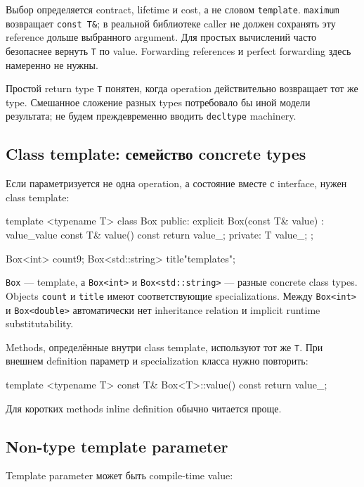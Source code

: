 Выбор определяется contract, lifetime и cost, а не словом \texttt{template}.
\texttt{maximum} возвращает \texttt{const T\&}; в реальной библиотеке caller
не должен сохранять эту reference дольше выбранного argument. Для простых
вычислений часто безопаснее вернуть \texttt{T} по value. Forwarding references
и perfect forwarding здесь намеренно не нужны.

Простой return type \texttt{T} понятен, когда operation действительно
возвращает тот же type. Смешанное сложение разных types потребовало бы иной
модели результата; не будем преждевременно вводить \texttt{decltype} machinery.

\subsection{Class template: семейство concrete types}

Если параметризуется не одна operation, а состояние вместе с interface,
нужен class template:

\begin{cppcode}
template <typename T>
class Box {
public:
    explicit Box(const T& value) : value_{value} {}
    const T& value() const { return value_; }
private:
    T value_;
};

Box<int> count{9};
Box<std::string> title{"templates"};
\end{cppcode}

\texttt{Box} --- template, а \texttt{Box<int>} и
\texttt{Box<std::string>} --- разные concrete class types. Objects \texttt{count}
и \texttt{title} имеют соответствующие specializations. Между
\texttt{Box<int>} и \texttt{Box<double>} автоматически нет inheritance
relation и implicit runtime substitutability.

Methods, определённые внутри class template, используют тот же \texttt{T}.
При внешнем definition параметр и specialization класса нужно повторить:

\begin{cppcode}
template <typename T>
const T& Box<T>::value() const {
    return value_;
}
\end{cppcode}

Для коротких methods inline definition обычно читается проще.

\subsection{Non-type template parameter}

Template parameter может быть compile-time value:

